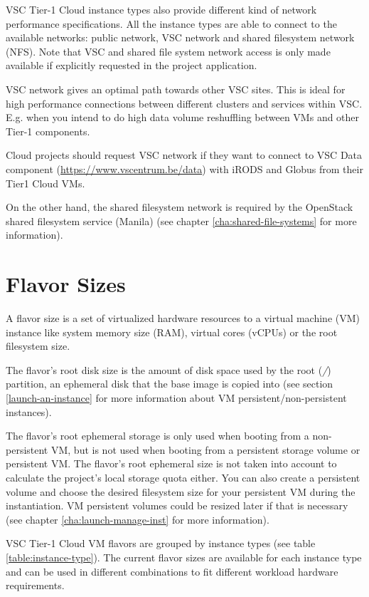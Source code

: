 VSC Tier-1 Cloud instance types also provide different kind of network
performance specifications. All the instance types are able to connect
to the available networks: public network, VSC network and shared filesystem
network (NFS). Note that VSC and shared file system network access is only made available
if explicitly requested in the project application.

VSC network gives an optimal path towards other VSC sites. This is ideal for high
performance connections between different clusters and services within VSC.
E.g. when you intend to do high data volume reshuffling between VMs and other Tier-1 components.

 Cloud projects should request VSC network if they want to
connect to VSC Data component (\url{https://www.vscentrum.be/data}) with iRODS
and Globus from their Tier1 Cloud VMs.

On the other hand, the shared filesystem network is required by the OpenStack
shared filesystem service (Manila) (see chapter \ref{cha:shared-file-systems}
for more information).


\section{Flavor Sizes}\label{sec:flavor-sizes}
A flavor size is a set of virtualized hardware resources to a virtual
machine (VM) instance like system memory size (RAM), virtual cores (vCPUs)
or the root filesystem size. 

The flavor's root disk size is the amount of disk space
used by the root (\emph{/}) partition, an ephemeral disk that the
base image is copied into (see section \ref{launch-an-instance} for
more information about VM persistent/non-persistent instances).

The flavor's root ephemeral storage is only used when booting from
a non-persistent VM, but is not used when booting from a persistent storage volume or
persistent VM.
The flavor's root ephemeral size is not taken into account to
calculate the project's local storage quota either. You can also
create a persistent volume and choose the desired filesystem size for
your persistent VM during the instantiation.
VM persistent volumes could be resized later if that is necessary
(see chapter \ref{cha:launch-manage-inst} for more information).

VSC Tier-1 Cloud VM flavors are grouped by instance types
(see table \ref{table:instance-type}). The current flavor sizes are
available for each instance type and can be used in different
combinations to fit different workload hardware requirements.

